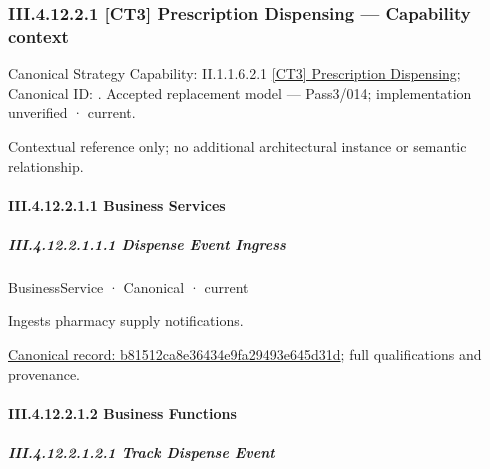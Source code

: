 \subsubsection*{III.4.12.2.1 [CT3] Prescription Dispensing — Capability context}
\label{navigation:III.4.12.2.1}

{\small Canonical Strategy Capability: II.1.1.6.2.1 \hyperref[element:2243de4f266e4ab6ba7964a1799f2c7e]{[CT3] Prescription Dispensing}; Canonical ID: \texttt{}. Accepted replacement model — Pass3/014; implementation unverified · current.}\par
Contextual reference only; no additional architectural instance or semantic relationship.\par
\paragraph*{III.4.12.2.1.1 Business Services}
\label{navigation:III.4.12.2.1.1}

\subparagraph*{III.4.12.2.1.1.1 Dispense Event Ingress}
\label{navigation:III.4.12.2.1.1.1}

\label{element:b81512ca8e36434e9fa29493e645d31d}
{\small BusinessService · Canonical · current}\par

Ingests pharmacy supply notifications.


{\footnotesize \href{../../../../../../../../continuum/business/business-service/b81512ca8e36434e9fa29493e645d31d.md}{Canonical record: b81512ca8e36434e9fa29493e645d31d}; full qualifications and provenance.}\par
\paragraph*{III.4.12.2.1.2 Business Functions}
\label{navigation:III.4.12.2.1.2}

\subparagraph*{III.4.12.2.1.2.1 Track Dispense Event}
\label{navigation:III.4.12.2.1.2.1}

